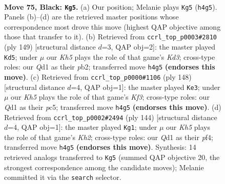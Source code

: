 \documentclass[11pt]{article}
\begin{document}
\clearpage

\begin{figure}[p]\centering
\begin{subfigure}{0.46\textwidth}\centering
\resizebox{\linewidth}{!}{%
\newchessgame
\chessboard[
  setfen={8/8/1p6/p7/2P4k/K7/8/3q4 b - - 7 75},
  showmover=false,
  pgfstyle=straightmove, color=movearrow, markmove={h4-g5}
]}
\caption{}
\end{subfigure}\hfill
\begin{subfigure}{0.46\textwidth}\centering
\resizebox{\linewidth}{!}{%
\newchessgame
\chessboard[
  setfen={8/6p1/3k2Pp/8/5K2/8/1P6/8 b - - 2 75},
  showmover=false,
  pgfstyle=straightmove, color=movearrow, markmove={d6-d5}
]}
\caption{}
\end{subfigure}
\\[4pt]
\begin{subfigure}{0.46\textwidth}\centering
\resizebox{\linewidth}{!}{%
\newchessgame
\chessboard[
  setfen={8/8/8/p1p1k3/2P5/1P3K2/8/8 w - - 1 75},
  showmover=false,
  pgfstyle=straightmove, color=movearrow, markmove={f3-e3}
]}
\caption{}
\end{subfigure}\hfill
\begin{subfigure}{0.46\textwidth}\centering
\resizebox{\linewidth}{!}{%
\newchessgame
\chessboard[
  setfen={8/8/4k3/6Pp/5p1P/8/7K/8 w - - 10 73},
  showmover=false,
  pgfstyle=straightmove, color=movearrow, markmove={h2-g1}
]}
\caption{}
\end{subfigure}
\caption{\textbf{Move 75, Black: \texttt{Kg5}.} (a) Our position; Melanie plays \texttt{Kg5} (\texttt{h4g5}). Panels (b)--(d) are the retrieved master positions whose correspondence most drove this move (highest QAP objective among those that transfer to it). (b) Retrieved from \texttt{ccrl\_top\_p0003\#2810} (ply 149) [structural distance $d$=3, QAP obj=2]: the master played \texttt{Kd5}; under $\mu$ our \emph{Kh5} plays the role of that game's \emph{Kd3}; cross-type roles: our \emph{Q}d1 as their \emph{p}b2; transferred move \texttt{h4g5} \textbf{(endorses this move)}. (c) Retrieved from \texttt{ccrl\_top\_p0000\#1106} (ply 148) [structural distance $d$=4, QAP obj=1]: the master played \texttt{Ke3}; under $\mu$ our \emph{Kh5} plays the role of that game's \emph{Kf3}; cross-type roles: our \emph{Q}d1 as their \emph{p}c5; transferred move \texttt{h4g5} \textbf{(endorses this move)}. (d) Retrieved from \texttt{ccrl\_top\_p0002\#2494} (ply 144) [structural distance $d$=4, QAP obj=1]: the master played \texttt{Kg1}; under $\mu$ our \emph{Kh5} plays the role of that game's \emph{Kh2}; cross-type roles: our \emph{Q}d1 as their \emph{p}f4; transferred move \texttt{h4g5} \textbf{(endorses this move)}. Synthesis: 14 retrieved analogs transferred to \texttt{Kg5} (summed QAP objective 20, the strongest correspondence among the candidate moves); Melanie committed it via the \texttt{search} selector.}
\label{fig:thought-m149}
\end{figure}
\end{document}
